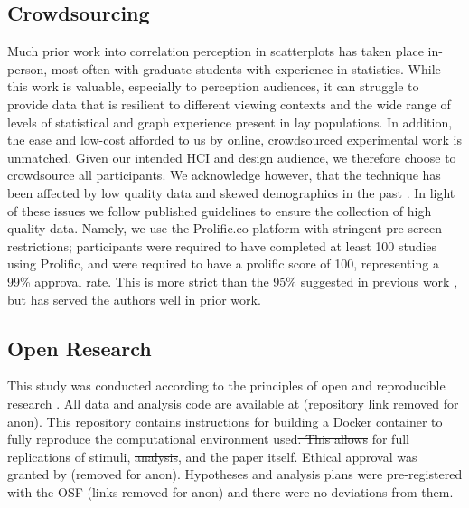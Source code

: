 \documentclass[manuscript, review, anonymous, screen]{acmart}
\providecommand{\DIFaddtex}[1]{{\protect\color{blue}\uwave{#1}}} %
\providecommand{\DIFdeltex}[1]{{\protect\color{red}\sout{#1}}}                      %
\providecommand{\DIFaddbegin}{} %
\providecommand{\DIFaddend}{} %
\providecommand{\DIFdelbegin}{} %
\providecommand{\DIFdelend}{} %
\providecommand{\DIFadd}[1]{\texorpdfstring{\DIFaddtex{#1}}{#1}} %
\providecommand{\DIFdel}[1]{\texorpdfstring{\DIFdeltex{#1}}{}} %
\newcommand{\DIFscaledelfig}{0.5}
\newlength{\DIFdelgraphicswidth} %
\newlength{\DIFdelgraphicsheight} %
\newcommand{\DIFaddincludegraphics}[2][]{{\color{blue}\fbox{\DIFOincludegraphics[#1]{#2}}}} %
\newcommand{\DIFdelincludegraphics}[2][]{%
\sbox{\DIFdelgraphicsbox}{\DIFOincludegraphics[#1]{#2}}%
\settoboxwidth{\DIFdelgraphicswidth}{\DIFdelgraphicsbox} %
\settoboxtotalheight{\DIFdelgraphicsheight}{\DIFdelgraphicsbox} %
\scalebox{\DIFscaledelfig}{%
\parbox[b]{\DIFdelgraphicswidth}{\usebox{\DIFdelgraphicsbox}\\[-\baselineskip] \rule{\DIFdelgraphicswidth}{0em}}\llap{\resizebox{\DIFdelgraphicswidth}{\DIFdelgraphicsheight}{%
\setlength{\unitlength}{\DIFdelgraphicswidth}%
\begin{picture}(1,1)%
\thicklines\linethickness{2pt} %
{\color[rgb]{1,0,0}\put(0,0){\framebox(1,1){}}}%
{\color[rgb]{1,0,0}\put(0,0){\line( 1,1){1}}}%
{\color[rgb]{1,0,0}\put(0,1){\line(1,-1){1}}}%
\end{picture}%
}\hspace*{3pt}}} %
} %
\DeclareRobustCommand{\DIFaddbegin}{\DIFOaddbegin \let\includegraphics\DIFaddincludegraphics} %
\DeclareRobustCommand{\DIFaddend}{\DIFOaddend \let\includegraphics\DIFOincludegraphics} %
\DeclareRobustCommand{\DIFdelbegin}{\DIFOdelbegin \let\includegraphics\DIFdelincludegraphics} %
\DeclareRobustCommand{\DIFdelend}{\DIFOaddend \let\includegraphics\DIFOincludegraphics} %
\begin{document}
\DIFaddend \hypertarget{sec-crowdsourcing}{%
\subsection{Crowdsourcing}\label{sec-crowdsourcing}}

Much prior work into correlation perception in scatterplots has taken
place in-person, most often with graduate students with experience in
statistics. While this work is valuable, especially to perception
audiences, it can struggle to provide data that is resilient to
different viewing contexts and the wide range of levels of statistical
and graph experience present in lay populations. In addition, the ease
and low-cost afforded to us by online, crowdsourced experimental work is
unmatched. Given our intended HCI and design audience, we therefore
choose to crowdsource all participants. We acknowledge however, that the
technique has been affected by low quality data and skewed demographics
in the past \citep{chmielewski_2020, charalambides_2021, peer_2021}. In
light of these issues we follow published guidelines \citep{peer_2021}
to ensure the collection of high quality data. Namely, we use the
Prolific.co platform \citep{prolific} with stringent pre-screen
restrictions; participants were required to have completed at least 100
studies using Prolific, and were required to have a prolific score of
100, representing a 99\% approval rate. This is more strict than the
95\% suggested in previous work \citep{peer_2021}, but has served the
authors well in prior work.

\hypertarget{sec-open-research}{%
\subsection{Open Research}\label{sec-open-research}}

This study was conducted according to the principles of open and
reproducible research \citep{ayris_2018}. All data and analysis code are
available at (repository link removed for anon). This repository
contains instructions for building a Docker container to fully reproduce
the computational environment used\DIFdelbegin \DIFdel{. This allows }\DIFdelend \DIFaddbegin \DIFadd{, allowing }\DIFaddend for full replications of
stimuli, \DIFdelbegin \DIFdel{analysis}\DIFdelend \DIFaddbegin \DIFadd{analyses}\DIFaddend , and the paper itself. Ethical approval was granted by
(removed for anon). Hypotheses and analysis plans were pre-registered
with the OSF (links removed for anon) and there were no deviations from
them.
\end{document}
